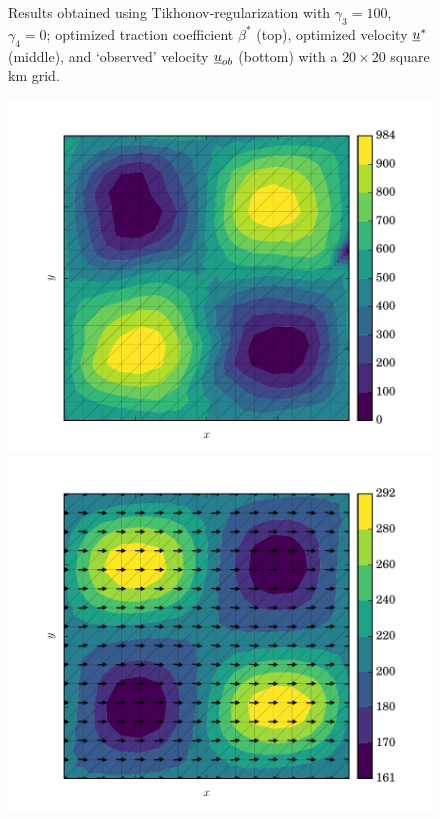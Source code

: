 \begin{figure}
  \caption[Tikhonov-regularized inverse ISMIP-HOM results with $\gamma_3=100$]{Results obtained using Tikhonov-regularization with $\gamma_3=100$, $\gamma_4=0$; optimized traction coefficient $\beta^*$ (top), optimized velocity $\underline{u}^*$ (middle), and `observed' velocity $\underline{u}_{ob}$ (bottom) with a $20 \times 20$ square km grid.}
  \label{inverse_ismip_opt_tikhonov_100}
\end{figure}

\begin{figure}
  \centering
    \includegraphics[width=0.9\linewidth]{images/data_assimilation/ISMIP_HOM_C/Tikhonov_500/beta_opt.pdf}
    \includegraphics[width=0.9\linewidth]{images/data_assimilation/ISMIP_HOM_C/Tikhonov_500/U_opt.pdf}

\end{figure}
